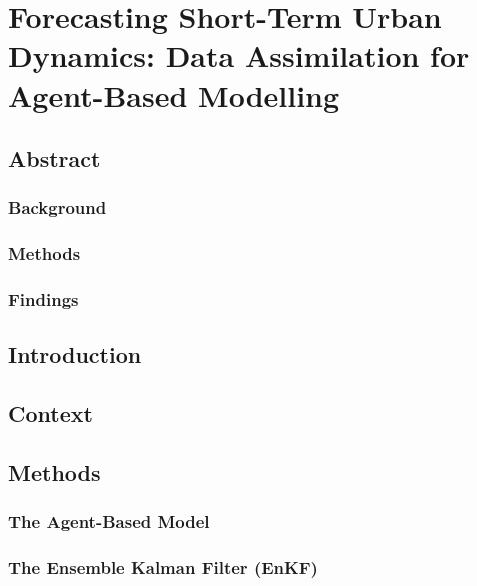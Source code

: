 \chapter{Forecasting Short-Term Urban Dynamics: Data Assimilation for Agent-Based Modelling}
\label{ch:malleson_tapper_ward_evans}

\section{Abstract}
\label{malleson:abstract}

\subsection{Background}
\label{malleson:abstract:background}

\subsection{Methods}
\label{malleson:abstract:methods}

\subsection{Findings}
\label{malleson:abstract:findings}

\section{Introduction}
\label{malleson:intro}

\section{Context}
\label{malleson:context}

\section{Methods}
\label{malleson:methods}

\subsection{The Agent-Based Model}
\label{malleson:methods:abm}

\subsection{The Ensemble Kalman Filter (EnKF)}
\label{malleson:methods:enkf}

